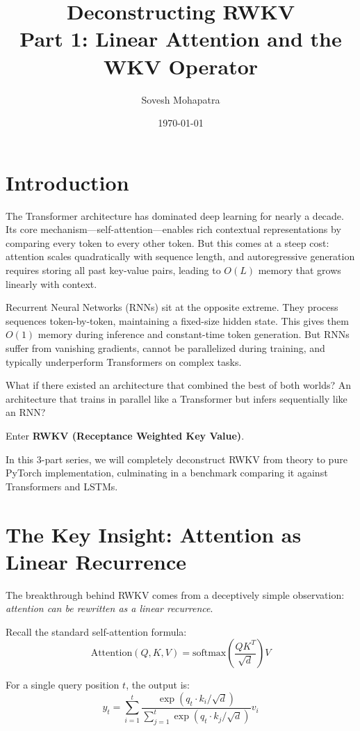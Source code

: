 \documentclass[12pt]{article}
\title{\textbf{Deconstructing RWKV \\ Part 1: Linear Attention and the WKV Operator}}
\author{Sovesh Mohapatra}
\date{\today}
\begin{document}
\maketitle

\section*{Introduction}
The Transformer architecture has dominated deep learning for nearly a decade. Its core mechanism—self-attention—enables rich contextual representations by comparing every token to every other token. But this comes at a steep cost: attention scales quadratically with sequence length, and autoregressive generation requires storing all past key-value pairs, leading to $O(L)$ memory that grows linearly with context.

Recurrent Neural Networks (RNNs) sit at the opposite extreme. They process sequences token-by-token, maintaining a fixed-size hidden state. This gives them $O(1)$ memory during inference and constant-time token generation. But RNNs suffer from vanishing gradients, cannot be parallelized during training, and typically underperform Transformers on complex tasks.

What if there existed an architecture that combined the best of both worlds? An architecture that trains in parallel like a Transformer but infers sequentially like an RNN?

Enter \textbf{RWKV (Receptance Weighted Key Value)}.

In this 3-part series, we will completely deconstruct RWKV from theory to pure PyTorch implementation, culminating in a benchmark comparing it against Transformers and LSTMs.

\section*{The Key Insight: Attention as Linear Recurrence}

The breakthrough behind RWKV comes from a deceptively simple observation: \textit{attention can be rewritten as a linear recurrence}.

Recall the standard self-attention formula:
\begin{equation}
    \text{Attention}(Q, K, V) = \text{softmax}\left(\frac{QK^T}{\sqrt{d}}\right)V
\end{equation}

For a single query position $t$, the output is:
\begin{equation}
    y_t = \sum_{i=1}^{t} \frac{\exp(q_t \cdot k_i / \sqrt{d})}{\sum_{j=1}^{t} \exp(q_t \cdot k_j / \sqrt{d})} v_i
\end{equation}
\end{document}
